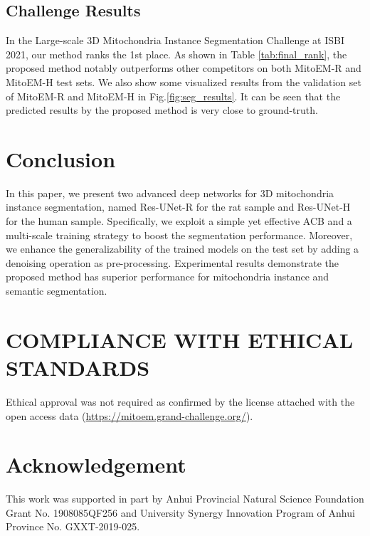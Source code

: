 \documentclass{article}
\begin{document}
\vspace{-0.3cm}
\subsection{Challenge Results}
\vspace{-0.2cm}
In the Large-scale 3D Mitochondria Instance Segmentation Challenge at ISBI 2021, our method ranks the 1st place. As shown in Table \ref{tab:final_rank}, the proposed method notably outperforms other competitors on both MitoEM-R and MitoEM-H test sets.  We also show some visualized results from the validation set of MitoEM-R and MitoEM-H in Fig.\ref{fig:seg_results}. It can be seen that the predicted results by the proposed method is very close to ground-truth.

\vspace{-0.3cm}

\section{Conclusion}
\label{sec:conclusion}
In this paper, we present two advanced deep networks for 3D mitochondria instance segmentation, named Res-UNet-R for the rat sample and Res-UNet-H for the human sample.  Specifically, we exploit a simple yet effective ACB and  a multi-scale training strategy to boost the segmentation performance.  Moreover, we enhance the generalizability of the trained models on the test set by adding a denoising operation as pre-processing. 
Experimental results demonstrate the proposed method has superior performance for mitochondria instance and semantic segmentation.




\section{COMPLIANCE WITH ETHICAL STANDARDS}
Ethical approval was not required as confirmed by the license attached with the open access data (\url{https://mitoem.grand-challenge.org/}).

\section{Acknowledgement}
This work was supported in part by Anhui Provincial Natural Science Foundation Grant No. 1908085QF256 and University Synergy Innovation Program of Anhui Province No. GXXT-2019-025.




\end{document}
